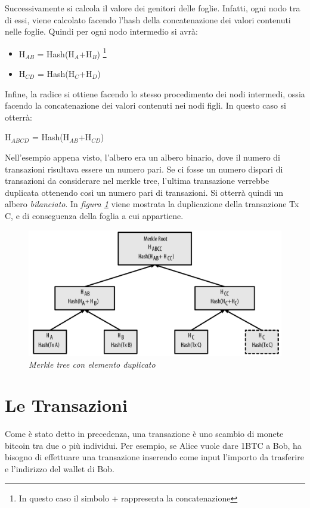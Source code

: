 Successivamente si calcola il valore dei genitori delle foglie. Infatti, ogni nodo tra di essi, viene calcolato facendo l'hash della concatenazione dei valori contenuti nelle foglie. Quindi per ogni nodo intermedio si avrà:
\begin{itemize}
	\item H$_{AB}$ = Hash(H$_A$+H$_B$) \footnote{In questo caso il simbolo + rappresenta la concatenazione}
	\item H$_{CD}$ = Hash(H$_C$+H$_D$)
\end{itemize}

Infine, la radice si ottiene facendo lo stesso procedimento dei nodi intermedi, ossia facendo la concatenazione dei valori contenuti nei nodi figli. In questo caso si otterrà:

H$_{ABCD}$ = Hash(H$_{AB}$+H$_{CD}$)

Nell'esempio appena visto, l'albero era un albero binario, dove il numero di transazioni risultava essere un numero pari. Se ci fosse un numero dispari di transazioni da considerare nel merkle tree, l'ultima transazione verrebbe duplicata ottenendo così un numero pari di transazioni. Si otterrà quindi un albero \textit{bilanciato}. In \textit{figura \ref{fig:merkletreedup}} viene mostrata la duplicazione della transazione Tx C, e di conseguenza della foglia a cui appartiene. \cite{antonopoulos2014mastering}

\begin{figure}[htbp]
	\centering
	\includegraphics[width= 0.5 \linewidth]{figure/merkletreedup}
	\caption{\textit{Merkle tree con elemento duplicato} \label{fig:merkletreedup}}
\end{figure}

\section{Le Transazioni}

Come è stato detto in precedenza, una transazione è uno scambio di monete bitcoin tra due o più individui. Per esempio, se Alice vuole dare 1BTC a Bob, ha bisogno di effettuare una transazione inserendo come input l'importo da trasferire e l'indirizzo del wallet di Bob. \\ 

